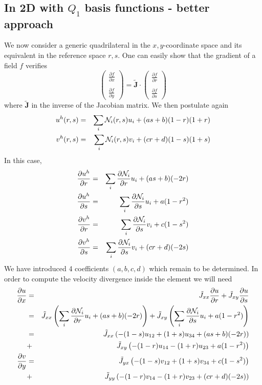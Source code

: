 \subsection{In 2D with $Q_1$ basis functions - better approach}

We now consider a generic quadrilateral in the $x,y$-coordinate space and its equivalent in the 
reference space $r,s$. One can easily show that the gradient of a field $f$ verifies 
\[
\left(
\begin{array}{c}
\frac{\partial f}{\partial x} \\ \\
\frac{\partial f}{\partial y} 
\end{array}
\right)
=
\tilde{\bm J} \cdot
\left(
\begin{array}{c}
\frac{\partial f}{\partial r} \\ \\
\frac{\partial f}{\partial s} 
\end{array}
\right)
\]
where $\tilde{\bm J}$ in the inverse of the Jacobian matrix.
We then postulate again
\begin{eqnarray}
u^h(r,s)&=&\sum_i {\mathcal{N}}_i(r,s) u_i + (a s + b)(1-r)(1+r) \nonumber\\
v^h(r,s)&=&\sum_i {\mathcal{N}}_i(r,s) v_i + (c r + d)(1-s)(1+s) \nonumber
\end{eqnarray}
In this case,
\begin{eqnarray}
\frac{\partial u^h}{\partial r}&=&\sum_i \frac{\partial {\mathcal{N}}_i}{\partial r} u_i + (a s + b) (-2r)   \nonumber\\
\frac{\partial u^h}{\partial s}&=&\sum_i \frac{\partial {\mathcal{N}}_i}{\partial s} u_i + a (1-r^2) \nonumber\\
\frac{\partial v^h}{\partial r}&=&\sum_i \frac{\partial {\mathcal{N}}_i}{\partial s} v_i + c (1-s^2) \nonumber\\
\frac{\partial v^h}{\partial s}&=&\sum_i \frac{\partial {\mathcal{N}}_i}{\partial s} v_i + (c r + d)(-2s) \nonumber
\end{eqnarray}
We have introduced 4 coefficients  $(a,b,c,d)$ which remain to be determined.
In order to compute the velocity divergence inside the element we will need 
\begin{eqnarray}
\frac{\partial u}{\partial x} 
&=& \tilde{J}_{xx} \frac{\partial u}{\partial r} +  \tilde{J}_{xy} \frac{\partial u}{\partial s}  \nonumber\\
&=& \tilde{J}_{xx} \left( \sum_i \frac{\partial {\mathcal{N}}_i}{\partial r} u_i + (a s + b) (-2r)  \right) 
 +  \tilde{J}_{xy} \left( \sum_i \frac{\partial {\mathcal{N}}_i}{\partial s} u_i + a (1-r^2) \right)  \nonumber\\
&=& \tilde{J}_{xx} \left(  -(1-s) u_{12} + (1+s) u_{34} + (a s + b) (-2r)  \right) \nonumber\\ 
&+&  \tilde{J}_{xy} \left(  -(1-r) u_{14} - (1+r) u_{23} + a (1-r^2) \right)
\nonumber\\
\frac{\partial v}{\partial y} 
&=& \tilde{J}_{yx} \left(  -(1-s) v_{12} + (1+s) v_{34} + c (1-s^2)   \right)  \nonumber\\
&+&  \tilde{J}_{yy} \left(  -(1-r) v_{14} - (1+r) v_{23} + (cr+d) (-2s) \right) \nonumber
\end{eqnarray}
